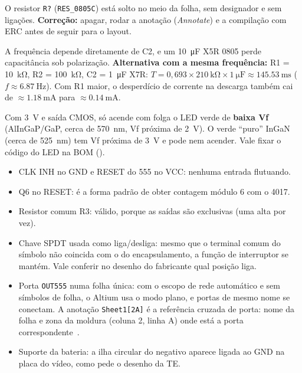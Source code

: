 \documentclass[11pt,a4paper]{article}
\begin{document}
\begin{achado}
O resistor \texttt{R?} (\texttt{RES\_0805C}) está solto no meio da folha, sem
designador e sem ligações. \textbf{Correção:} apagar, rodar a anotação
(\emph{Annotate}) e a compilação com ERC antes de seguir para o layout.
\end{achado}

\begin{achado}
A frequência depende diretamente de C2, e um \SI{10}{\micro\farad} X5R 0805 perde
capacitância sob polarização. \textbf{Alternativa com a mesma frequência:}
R1 = \SI{10}{\kilo\ohm}, R2 = \SI{100}{\kilo\ohm}, C2 = \SI{1}{\micro\farad} X7R:
$T = 0{,}693 \times \SI{210}{\kilo\ohm} \times \SI{1}{\micro\farad} \approx
\SI{145,53}{\milli\second}$ ($f \approx \SI{6,87}{\hertz}$). Com R1 maior, o
desperdício de corrente na descarga também cai de $\approx \SI{1,18}{\milli\ampere}$ para
$\approx \SI{0,14}{\milli\ampere}$.
\end{achado}

\begin{achado}
Com \SI{3}{\volt} e saída CMOS, só acende com folga o LED verde de \textbf{baixa Vf}
(AlInGaP/GaP, cerca de \SI{570}{\nano\meter}, Vf próxima de \SI{2}{\volt}). O verde
“puro” InGaN (cerca de \SI{525}{\nano\meter}) tem Vf próxima de \SI{3}{\volt} e pode nem
acender. Vale fixar o código do LED na BOM (\DSledcomp).
\end{achado}

\begin{achado}
\begin{itemize}[leftmargin=*]
  \item CLK INH no GND e RESET do 555 no VCC: nenhuma entrada flutuando.
  \item Q6 no RESET: é a forma padrão de obter contagem módulo 6 com o 4017.
  \item Resistor comum R3: válido, porque as saídas são exclusivas (uma alta por vez).
  \item Chave SPDT usada como liga/desliga: mesmo que o terminal comum do símbolo não
  coincida com o do encapsulamento, a função de interruptor se mantém. Vale conferir no
  desenho do fabricante qual posição liga.
  \item Porta \texttt{OUT555} numa folha única: com o escopo de rede automático e sem
  símbolos de folha, o Altium usa o modo plano, e portas de mesmo nome se conectam. A
  anotação \texttt{Sheet1[2A]} é a referência cruzada de porta: nome da folha e zona da
  moldura (coluna 2, linha A) onde está a porta correspondente~\DSaltium.
  \item Suporte da bateria: a ilha circular do negativo aparece ligada ao GND na placa do
  vídeo, como pede o desenho da TE.
\end{itemize}
\end{achado}
\end{document}
